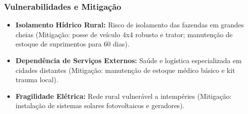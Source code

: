\subsubsection{Vulnerabilidades e
Mitigação}

\begin{itemize}
\tightlist
\item
  \textbf{Isolamento Hídrico Rural:} Risco de isolamento das fazendas em
  grandes cheias (Mitigação: posse de veículo 4x4 robusto e trator;
  manutenção de estoque de suprimentos para 60 dias).
\item
  \textbf{Dependência de Serviços Externos:} Saúde e logística
  especializada em cidades distantes (Mitigação: manutenção de estoque
  médico básico e kit trauma local).
\item
  \textbf{Fragilidade Elétrica:} Rede rural vulnerável a intempéries
  (Mitigação: instalação de sistemas solares fotovoltaicos e geradores).
\end{itemize}

